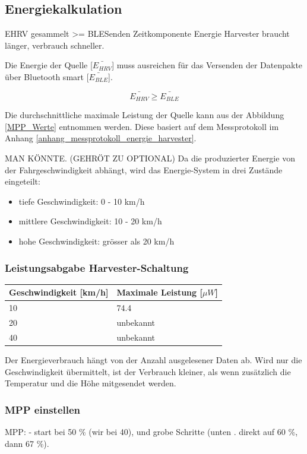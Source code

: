 \subsection{Energiekalkulation}
EHRV gesammelt >= BLESenden
Zeitkomponente
Energie Harvester braucht länger, verbrauch schneller.

Die Energie der Quelle [$\bar{E_{HRV}} $] muss ausreichen für das Versenden der Datenpakte über Bluetooth smart [$\bar{E_{BLE}}$].

\[\bar{E_{HRV}} \ge \bar{E_{BLE}}  \]


Die durchschnittliche maximale Leistung der Quelle kann aus der Abbildung \ref{MPP_Werte} entnommen werden. Diese basiert auf dem Messprotokoll im Anhang \ref{anhang_messprotokoll_energie_harvester}. 

MAN KÖNNTE. (GEHRÖT ZU OPTIONAL) Da die produzierter Energie von der Fahrgeschwindigkeit abhängt, wird das Energie-System in drei Zustände eingeteilt:

\begin{itemize}
    \item tiefe Geschwindigkeit: 0 - 10 km/h
    \item mittlere Geschwindigkeit: 10 - 20 km/h 
    \item hohe Geschwindigkeit: grösser als 20 km/h 
\end{itemize}



\subsubsection*{Leistungsabgabe Harvester-Schaltung}

\begin{tabular}{|l|l|}\hline \label{MPP_Werte} 
    Geschwindigkeit [km/h] & Maximale Leistung [$\mu W$] \\ \hline
    10 & 74.4 \\ \hline
    20 & unbekannt \\ \hline
    40 & unbekannt \\ \hline
\end{tabular}


Der Energieverbrauch hängt von der Anzahl ausgelesener Daten ab. Wird nur die Geschwindigkeit übermittelt, ist der Verbrauch kleiner, als wenn zusätzlich die Temperatur und die Höhe mitgesendet werden.


\subsubsection{MPP einstellen}
MPP:
- start bei 50 \% (wir bei 40), und grobe Schritte (unten . direkt auf 60 \%, dann 67 \%). 



